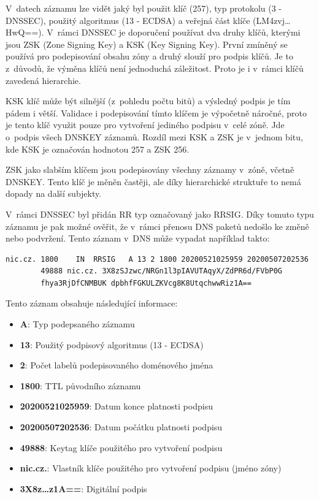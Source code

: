 \documentclass[thesis=M,czech]{src/FITthesis}[2019/12/23]
\begin{document}
V~datech záznamu lze vidět jaký byl použit klíč (257), typ \linebreak protokolu (3 - DNSSEC), použitý algoritmus (13 - ECDSA) a veřejná část klíče (LM4zvj\ldots HwQ==). V~rámci DNSSEC je doporučení používat dva druhy klíčů, kterými jsou ZSK (Zone Signing Key) a KSK (Key Signing Key). První zmíněný se používá pro podepisování obsahu zóny a druhý slouží pro podpis klíčů. Je to z~důvodů, že výměna klíčů není jednoduchá záležitost. Proto je i v~rámci klíčů zavedená hierarchie. 

KSK klíč může být silnější (z~pohledu počtu bitů) a výsledný podpis je tím pádem i větší. Validace i podepisování tímto klíčem je výpočetně náročné, proto je tento klíč využit pouze pro vytvoření jediného podpisu v~celé zóně. Jde o~podpis všech DNSKEY záznamů. Rozdíl mezi KSK a ZSK je v~jednom bitu, kde KSK je označován hodnotou 257 a ZSK 256. 

ZSK jako slabším klíčem jsou podepisovány všechny záznamy v~zóně, včetně DNSKEY. Tento klíč je měněn častěji, ale díky hierarchické struktuře to nemá dopady na další subjekty.

V~rámci DNSSEC byl přidán RR typ označovaný jako RRSIG. Díky tomuto typu záznamu je pak možné ověřit, že v~rámci přenosu DNS paketů nedošlo ke změně nebo podvržení. Tento záznam v~DNS může vypadat \linebreak například takto: 
\begin{verbatim}
nic.cz. 1800	IN	RRSIG	A 13 2 1800 20200521025959 20200507202536
        49888 nic.cz. 3X8zSJzwc/NRGn1l3pIAVUTAqyX/ZdPR6d/FVbP0G
        fhya3RjDfCNMBUK dpbhfFGKULZKVcg8K8UtqchwwRiz1A==
\end{verbatim}

Tento záznam obsahuje následující informace: 

\begin{itemize}
	\item \textbf{A}: Typ podepsaného záznamu 
	\item \textbf{13}: Použitý podpisový algoritmus (13 - ECDSA)
	\item \textbf{2}: Počet labelů podepisovaného doménového jména	
	\item \textbf{1800}: TTL původního záznamu
	\item \textbf{20200521025959}: Datum konce platnosti podpisu
	\item \textbf{20200507202536}: Datum počátku platnosti podpisu
	\item \textbf{49888}: Keytag klíče použitého pro vytvoření podpisu
	\item \textbf{nic.cz.}: Vlastník klíče použitého pro vytvoření podpisu (jméno zóny)
	\item \textbf{3X8z\ldots z1A==}: Digitální podpis
\end{itemize}
\end{document}
